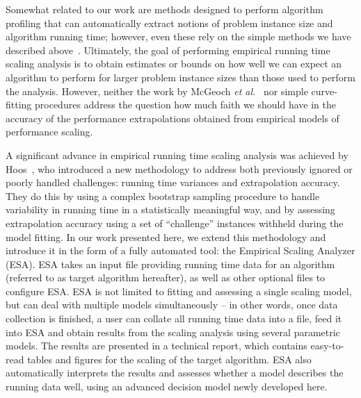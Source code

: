 \documentclass[aic]{iosart2x}
\newcommand{\etal}{\emph{et al.}}
\begin{document}
Somewhat related to our work are methods designed to perform algorithm profiling that can automatically extract notions of problem instance size and algorithm running time; however, even these rely on the simple methods we have described above~\cite{ZapHau12,CopEtAl12,CopEtAl14}. 
Ultimately, the goal of performing empirical running time scaling analysis is to obtain estimates or bounds on how well we can expect an algorithm to perform for larger problem instance sizes than those used to perform the analysis.
However, neither the work by McGeoch \etal~\cite{McgEtAl02} nor simple curve-fitting procedures address the  question how much faith we should have in the accuracy of the performance extrapolations obtained from empirical models of performance scaling.

A significant advance in empirical running time scaling analysis was achieved by Hoos~\cite{Hoo09}, who introduced a new methodology to address both previously ignored or poorly handled challenges: running time variances and extrapolation accuracy.
They do this by using a complex bootstrap sampling procedure to handle variability in running time in a statistically meaningful way, and by assessing extrapolation accuracy using a set of ``challenge'' instances withheld during the model fitting.  
In our work presented here, we extend this methodology and introduce it in the form of a fully automated tool: the Empirical Scaling Analyzer (ESA). 
ESA takes an input file providing running time data for an algorithm (referred to as target algorithm hereafter), as well as other optional files to configure ESA. 
ESA is not limited to fitting and assessing a single scaling model, but can deal with multiple models simultaneously -- in other words, once data collection is finished, a user can collate all running time data into a file, feed it into ESA and obtain results from the scaling analysis using several parametric models. 
The results are presented in a technical report, which contains easy-to-read tables and figures for the scaling of the target algorithm. 
ESA also automatically interprets the results and assesses whether a model describes the running data well, using an advanced decision model newly developed here.
\end{document}
